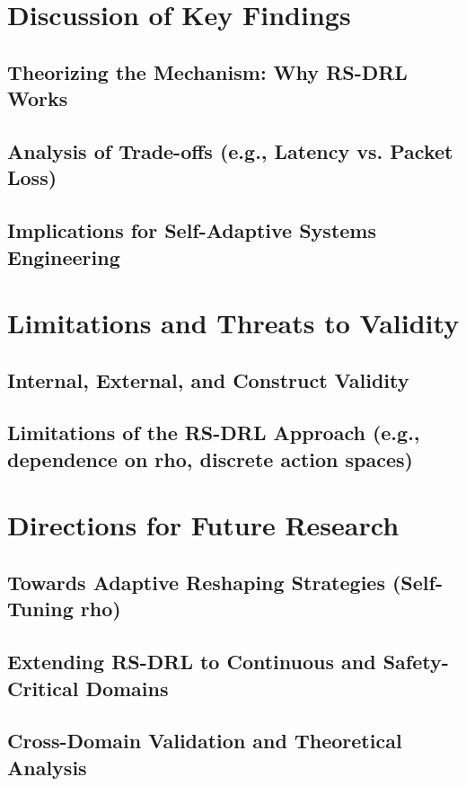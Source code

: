 \documentclass[11pt,a4paper]{article}
\begin{document}
\setcounter{section}{0}
\renewcommand{\thesection}{6.\arabic{section}}
\renewcommand{\thesubsection}{6.\arabic{section}.\arabic{subsection}}

\section{Discussion of Key Findings}
\subsection{Theorizing the Mechanism: Why RS-DRL Works}
\subsection{Analysis of Trade-offs (e.g., Latency vs. Packet Loss)}
\subsection{Implications for Self-Adaptive Systems Engineering}

\section{Limitations and Threats to Validity}
\subsection{Internal, External, and Construct Validity}
\subsection{Limitations of the RS-DRL Approach (e.g., dependence on rho, discrete action spaces)}

\section{Directions for Future Research}
\subsection{Towards Adaptive Reshaping Strategies (Self-Tuning rho)}
\subsection{Extending RS-DRL to Continuous and Safety-Critical Domains}
\subsection{Cross-Domain Validation and Theoretical Analysis}
\end{document}
